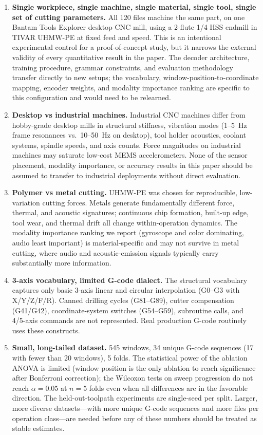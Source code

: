 \documentclass[sensors,article,submit,moreauthors,pdftex]{Definitions/mdpi}
\begin{document}
\begin{enumerate}[leftmargin=*]
    \item \textbf{Single workpiece, single machine, single material, single tool, single set of cutting parameters.} All 120 files machine the same part, on one Bantam Tools Explorer\texttrademark{} desktop CNC mill, using a 2-flute 1/4\textquotedbl{} HSS endmill in TIVAR UHMW-PE at fixed feed and speed. This is an intentional experimental control for a proof-of-concept study, but it narrows the external validity of every quantitative result in the paper. The decoder architecture, training procedure, grammar constraints, and evaluation methodology transfer directly to new setups; the vocabulary, window-position-to-coordinate mapping, encoder weights, and modality importance ranking are specific to this configuration and would need to be relearned.
    \item \textbf{Desktop vs industrial machines.} Industrial CNC machines differ from hobby-grade desktop mills in structural stiffness, vibration modes (1--5~Hz frame resonances vs.\ 10--50~Hz on desktop), tool holder acoustics, coolant systems, spindle speeds, and axis counts. Force magnitudes on industrial machines may saturate low-cost MEMS accelerometers. None of the sensor placement, modality importance, or accuracy results in this paper should be assumed to transfer to industrial deployments without direct evaluation.
    \item \textbf{Polymer vs metal cutting.} UHMW-PE was chosen for reproducible, low-variation cutting forces. Metals generate fundamentally different force, thermal, and acoustic signatures; continuous chip formation, built-up edge, tool wear, and thermal drift all change within-operation dynamics. The modality importance ranking we report (gyroscope and color dominating, audio least important) is material-specific and may not survive in metal cutting, where audio and acoustic-emission signals typically carry substantially more information.
    \item \textbf{3-axis vocabulary, limited G-code dialect.} The structural vocabulary captures only basic 3-axis linear and circular interpolation (G0--G3 with X/Y/Z/F/R). Canned drilling cycles (G81--G89), cutter compensation (G41/G42), coordinate-system switches (G54--G59), subroutine calls, and 4/5-axis commands are not represented. Real production G-code routinely uses these constructs.
    \item \textbf{Small, long-tailed dataset.} 545 windows, 34 unique G-code sequences (17 with fewer than 20 windows), 5 folds. The statistical power of the ablation ANOVA is limited (window position is the only ablation to reach significance after Bonferroni correction); the Wilcoxon tests on sweep progression do not reach $\alpha=0.05$ at $n=5$ folds even when all differences are in the favorable direction. The held-out-toolpath experiments are single-seed per split. Larger, more diverse datasets---with more unique G-code sequences and more files per operation class---are needed before any of these numbers should be treated as stable estimates.

\end{enumerate}
\end{document}
